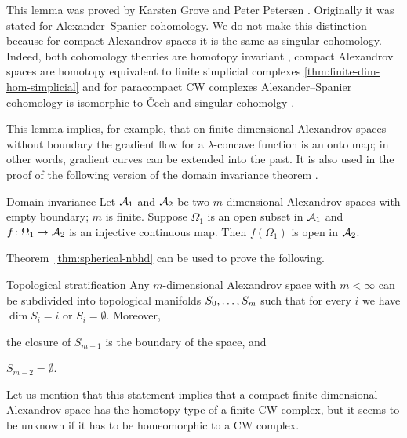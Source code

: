 This lemma was proved by Karsten Grove and Peter Petersen \cite{grove-petersen1993}.
Originally it was stated for Alexander--Spanier cohomology. We do not make this distinction  because for compact Alexandrov spaces it is the same as singular cohomology. Indeed,  both cohomology theories are homotopy invariant \cite[Chapter 6]{Spanier}, compact Alexandrov spaces are homotopy equivalent to finite simplicial complexes \ref{thm:finite-dim-hom-simplicial} and  for paracompact  CW complexes  Alexander--Spanier cohomology is isomorphic to \v{C}ech  and singular cohomolgy \cite[Chapter 6]{Spanier}.

This lemma implies, for example, that on finite-dimensional Alexandrov spaces without boundary 
the gradient flow for a $\lambda$-concave function is an onto map;
in other words, gradient curves can be extended into the past.
It is also used in the proof of the following version of the domain invariance theorem \cite[Theorem 3.2]{kapovitch-zhu}.

\begin{thm}{Domain invariance}\label{thm-inv-domain}
Let $\mathcal{A}_1$ and $\mathcal{A}_2$ be two $m$-dimensional Alexandrov spaces with empty boundary; $m$ is finite.
Suppose $\Omega_1$ is an open subset in $\mathcal{A}_1$ and $f\colon\Omega_1\to \mathcal{A}_2$ is an injective continuous map.
Then $f(\Omega_1)$ is open in $\mathcal{A}_2$.
\end{thm}

Theorem~\ref{thm:spherical-nbhd} can be used to prove the following. 

\begin{thm}{Topological stratification}\label{thm:top-stratification}
Any $m$-dimensional Alexandrov space with $m<\infty$ can be subdivided into topological manifolds $S_0,\dots,S_m$ such that for every $i$ we have $\dim S_i=i$ or $S_i=\emptyset$.
Moreover,
\begin{subthm}{}
the closure of $S_{m-1}$ is the boundary of the space, and
\end{subthm}

\begin{subthm}{}
$S_{m-2}=\emptyset$.
\end{subthm}

\end{thm}

Let us mention that this statement implies that a compact finite-dimensional Alexandrov space has the homotopy type of a finite CW complex,
but it seems to be unknown if it has to be homeomorphic to a CW complex.

